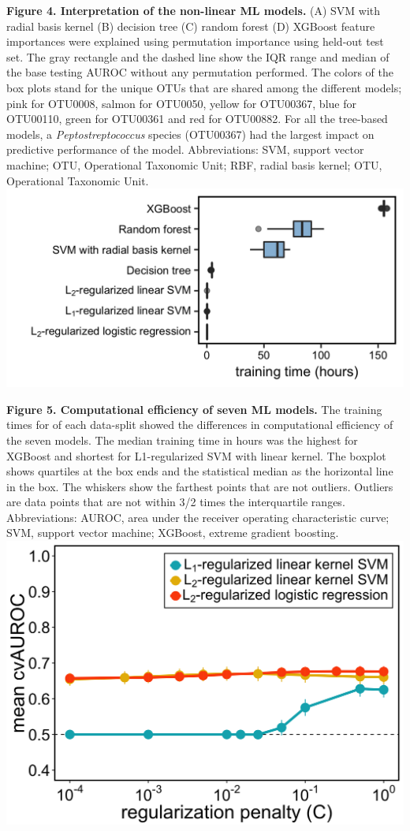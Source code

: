 \documentclass[11pt,]{article}
\begin{document}
\textbf{Figure 4. Interpretation of the non-linear ML models.} (A) SVM
with radial basis kernel (B) decision tree (C) random forest (D) XGBoost
feature importances were explained using permutation importance using
held-out test set. The gray rectangle and the dashed line show the IQR
range and median of the base testing AUROC without any permutation
performed. The colors of the box plots stand for the unique OTUs that
are shared among the different models; pink for OTU0008, salmon for
OTU0050, yellow for OTU00367, blue for OTU00110, green for OTU00361 and
red for OTU00882. For all the tree-based models, a
\emph{Peptostreptococcus} species (OTU00367) had the largest impact on
predictive performance of the model. Abbreviations: SVM, support vector
machine; OTU, Operational Taxonomic Unit; RBF, radial basis kernel; OTU,
Operational Taxonomic Unit. \newpage
\includegraphics{Figure_5.png}

\textbf{Figure 5. Computational efficiency of seven ML models.} The
training times for of each data-split showed the differences in
computational efficiency of the seven models. The median training time
in hours was the highest for XGBoost and shortest for L1-regularized SVM
with linear kernel. The boxplot shows quartiles at the box ends and the
statistical median as the horizontal line in the box. The whiskers show
the farthest points that are not outliers. Outliers are data points that
are not within 3/2 times the interquartile ranges. Abbreviations: AUROC,
area under the receiver operating characteristic curve; SVM, support
vector machine; XGBoost, extreme gradient boosting.\\
\newpage
\includegraphics{Figure_S1.png}
\end{document}
